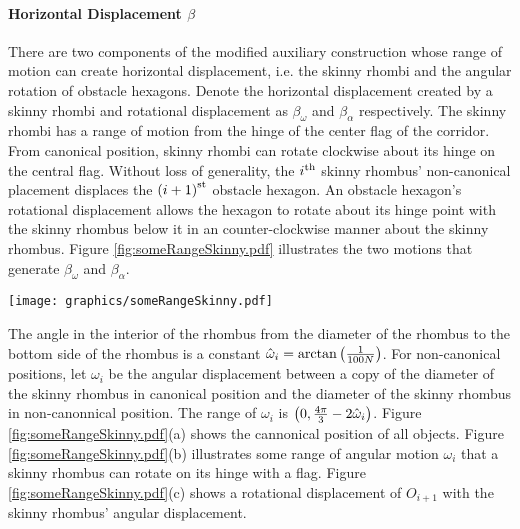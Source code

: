 \paragraph{Horizontal Displacement $\beta$}

There are two components of the modified auxiliary construction whose range of motion can create horizontal displacement, i.e. the skinny rhombi and the angular rotation of obstacle hexagons.  
Denote the horizontal displacement created by a skinny rhombi and rotational displacement as $\beta_\omega$ and $\beta_\alpha$ respectively.  
The skinny rhombi has a range of motion from the hinge of the center flag of the corridor.  
From canonical position, skinny rhombi can rotate clockwise about its hinge on the central flag.  
Without loss of generality, the $i^\text{th}$ skinny rhombus' non-canonical placement displaces the $\left( i+1 \right)^\text{st}$ obstacle hexagon.  
An obstacle hexagon's rotational displacement allows the hexagon to rotate about its hinge point with the skinny rhombus below it in an counter-clockwise manner about the skinny rhombus.  
Figure \ref{fig:someRangeSkinny.pdf} illustrates the two motions that generate $\beta_\omega$ and $\beta_\alpha$.

\begin{minipage}{\linewidth}
\begin{center}
\texttt{[image: graphics/someRangeSkinny.pdf]}
\label{fig:someRangeSkinny.pdf}
\end{center}
\end{minipage}

The angle in the interior of the rhombus from the diameter of the rhombus to the bottom side of the rhombus is a constant $\hat{\omega}_i = \arctan \left( \frac{1}{100N} \right)$.  
For non-canonical positions, let $\omega_i$ be the angular displacement between a copy of the diameter of the skinny rhombus in canonical position and the diameter of the skinny rhombus in non-canonnical position.
The range of $\omega_i$ is $\left( 0, \frac{4 \pi}{3} - 2 \hat{\omega}_i \right)$.
Figure \ref{fig:someRangeSkinny.pdf}(a) shows the cannonical position of all objects.  
Figure \ref{fig:someRangeSkinny.pdf}(b) illustrates some range of angular motion $\omega_i$ that a skinny rhombus can rotate on its hinge with a flag.  
Figure \ref{fig:someRangeSkinny.pdf}(c) shows a rotational displacement of $O_{i+1}$ with the skinny rhombus' angular displacement.


